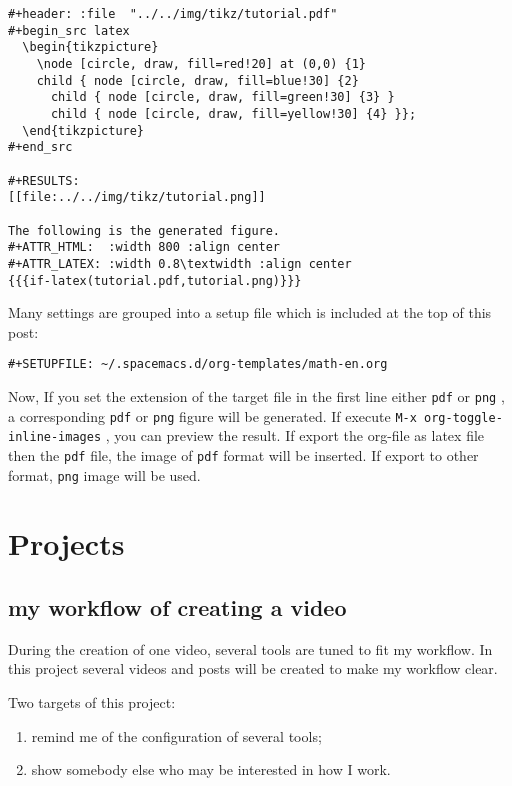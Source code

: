 \documentclass[koma,a4paper,utopia,10pt,listings-color,microtype,paralist,colorlinks]{org-article}
\begin{document}
\begin{verbatim}
#+header: :file  "../../img/tikz/tutorial.pdf"
#+begin_src latex
  \begin{tikzpicture}
    \node [circle, draw, fill=red!20] at (0,0) {1}
    child { node [circle, draw, fill=blue!30] {2}
      child { node [circle, draw, fill=green!30] {3} }
      child { node [circle, draw, fill=yellow!30] {4} }};
  \end{tikzpicture}
#+end_src

#+RESULTS:
[[file:../../img/tikz/tutorial.png]]

The following is the generated figure.
#+ATTR_HTML:  :width 800 :align center
#+ATTR_LATEX: :width 0.8\textwidth :align center
{{{if-latex(tutorial.pdf,tutorial.png)}}}
\end{verbatim}

Many settings are grouped into a setup file which is included at the top of this
post:
\begin{verbatim}
#+SETUPFILE: ~/.spacemacs.d/org-templates/math-en.org
\end{verbatim}

Now, If you set the extension of the target file in the first line either \texttt{pdf} or
\texttt{png} , a corresponding \texttt{pdf} or \texttt{png} figure will be generated. If execute \texttt{M-x
org-toggle-inline-images}  , you can preview the result. If export the org-file
as latex file then the \texttt{pdf} file, the image of \texttt{pdf} format will be inserted. If
export to other format, \texttt{png} image will be used.


\section{Projects}
\label{sec:org8f61cb8}


\subsection{my workflow of creating a video}
\label{sec:org597f5bb}
During the creation of one video, several tools are tuned to fit my workflow. In
this project several videos and posts will be created to make my workflow clear.

Two targets of this project:
\begin{enumerate}
\item remind me of the configuration of several tools;
\item show somebody else who may be interested in how I work.
\end{enumerate}
\end{document}
